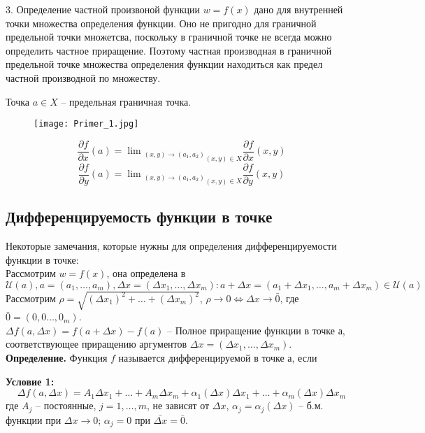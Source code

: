 \documentclass[a4paper,14pt]{article} %
\begin{document}
	3. Определение частной произвоной функции $w = f(x)$ дано для внутренней точки множества определения функции. Оно не пригодно для граничной предельной точки множетсва, поскольку в граничной точке не всегда можно определить частное приращение. Поэтому частная производная в граничной предельной точке множества определения функции находиться как предел частной производной по множеству.
	
	Точка $a \in X$ -- предельная граничная точка. 
	\begin{figure}[h!]
		\centering
		\texttt{[image: Primer\_1.jpg]}
		\label{fig:universe}
	\end{figure}
	\[\frac{\partial f}{\partial x}(a) = \lim{_{(x, y)\to (a_1, a_2)}}_{(x, y) \in X} \frac{\partial f} {\partial x}(x, y)\]
	\[\frac{\partial f}{\partial y}(a) = \lim{_{(x, y)\to (a_1, a_2)}}_{(x, y) \in X} \frac{\partial f} {\partial y}(x, y)\]
	\subsection*{Дифференцируемость функции в точке}
	
	Некоторые замечания, которые нужны для определения дифференцируемости функции в точке:\\
	
	Рассмотрим $w = f(x)$, она определена в $\mathscr{U}(a), a = (a_1, \ldots,a_m), \Delta x = (\Delta x_1, \ldots, \Delta x_m): a + \Delta x = (a_1 + \Delta x_1, \ldots , a_m + \Delta x_m) \in \mathscr{U}(a)$\\
	
	Рассмотрим $\rho = \sqrt{(\Delta x_1)^2 + \ldots + (\Delta x_m)^2}$,  $\rho \to 0 \Leftrightarrow \Delta x \to \bar0$, где $\bar0 = (0, 0\ldots, 0_m)$.\\
	
	$\Delta f(a, \Delta x) = f(a + \Delta x) - f(a)$ -- Полное приращение функции в точке а, соответствующее приращению аргументов $\Delta x = (\Delta x_1, \ldots, \Delta x_m)$.\\
	
	\textbf{Определение.} Функция $f$ называется дифференцируемой в точке а, если 
	
	\textbf{Условие 1:}
	\[\Delta f(a, \Delta x) = A_1 \Delta x_1 + \ldots + A_m \Delta x_m + \alpha_1(\Delta x) \Delta x_1 + \ldots + \alpha_m (\Delta x)\Delta x_m\] 
	где $A_j$ -- постоянные, $j = 1,\ldots,m$, не зависят от $\Delta x$, $\alpha_j = \alpha_j(\Delta x)$ -- б.м. функции при $\Delta x \to 0$; $\alpha_j = 0$ при $\bar{\Delta x} = \bar0$.\\
	
\end{document}
